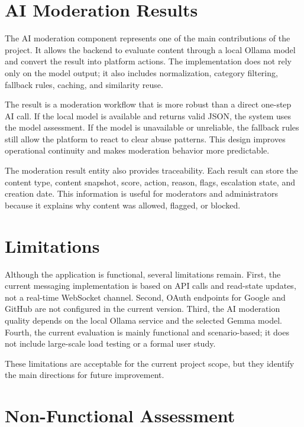 \section{AI Moderation Results}

The AI moderation component represents one of the main contributions of the project. It allows the backend to evaluate content through a local Ollama model and convert the result into platform actions. The implementation does not rely only on the model output; it also includes normalization, category filtering, fallback rules, caching, and similarity reuse.

The result is a moderation workflow that is more robust than a direct one-step AI call. If the local model is available and returns valid JSON, the system uses the model assessment. If the model is unavailable or unreliable, the fallback rules still allow the platform to react to clear abuse patterns. This design improves operational continuity and makes moderation behavior more predictable.

The moderation result entity also provides traceability. Each result can store the content type, content snapshot, score, action, reason, flags, escalation state, and creation date. This information is useful for moderators and administrators because it explains why content was allowed, flagged, or blocked.

\section{Limitations}

Although the application is functional, several limitations remain. First, the current messaging implementation is based on API calls and read-state updates, not a real-time WebSocket channel. Second, OAuth endpoints for Google and GitHub are not configured in the current version. Third, the AI moderation quality depends on the local Ollama service and the selected Gemma model. Fourth, the current evaluation is mainly functional and scenario-based; it does not include large-scale load testing or a formal user study.

These limitations are acceptable for the current project scope, but they identify the main directions for future improvement.

\section{Non-Functional Assessment}

